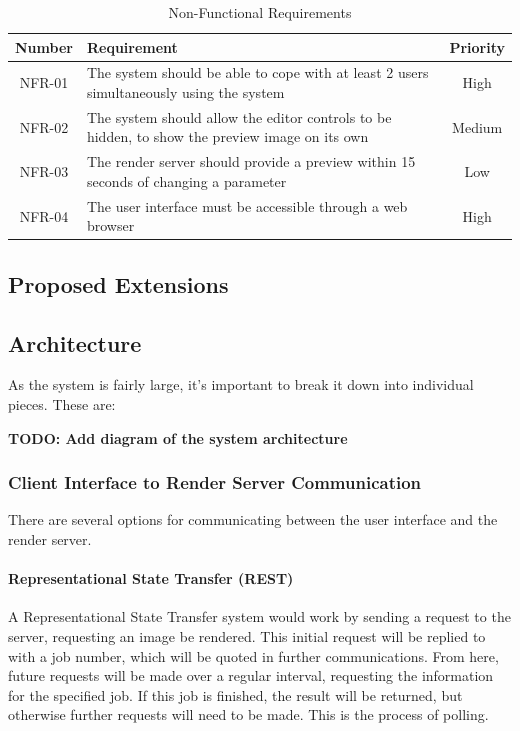 \documentclass[12pt,a4paper]{article}
\begin{document}
\begin{table}
  \centering
  \begin{tabular}{| c | p{12cm} | c |}
    \hline
    \textbf{Number} & \textbf{Requirement} & \textbf{Priority} \\
    \hline
    NFR-01 & The system should be able to cope with at least 2 users simultaneously using the system & High \\
    \hline
    NFR-02 & The system should allow the editor controls to be hidden, to show the preview image on its own & Medium \\
    \hline
    NFR-03 & The render server should provide a preview within 15 seconds of changing a parameter & Low \\
    \hline
    NFR-04 & The user interface must be accessible through a web browser & High \\
    \hline
  \end{tabular}
  \caption{Non-Functional Requirements}
  \label{NFRTable}
\end{table}


\subsection{Proposed Extensions}

\subsection{Architecture}
As the system is fairly large, it's important to break it down into individual pieces. These are:

\textbf{TODO: Add diagram of the system architecture}
  \subsubsection{Client Interface to Render Server Communication}
There are several options for communicating between the user interface and the render server.

\paragraph{Representational State Transfer (REST)}
A Representational State Transfer system would work by sending a request to the server,
requesting an image be rendered. This initial request will be replied to with a job number,
which will be quoted in further communications. From here, future requests will be made
over a regular interval, requesting the information for the specified job. If this job is finished,
the result will be returned, but otherwise further requests will need to be made. This is the process
of polling.
\end{document}
